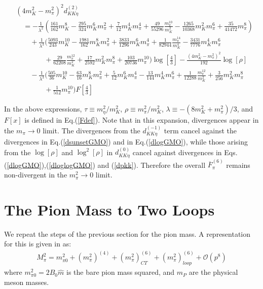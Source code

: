 \documentclass[12pt,a4paper]{article}
\begin{document}
\begin{align}
	& \left(4 m_{K}^2 - m_{\pi}^2\right)^2 {d}_{K K \eta}^{(2)} \nonumber \\
	& \quad = - \frac{1}{\lambda ^2} \left( \frac{161}{162} m_{K}^8 - \frac{295}{324} m_{K}^6 m_{\pi}^2 + \frac{7}{12} m_{K}^4 m_{\pi}^4 + \frac{49}{55296} \frac{m_{\pi}^{10}}{m_{K}^2} - \frac{1265}{10368} m_{K}^2 m_{\pi}^6 + \frac{35}{41472} m_{\pi}^8 \right) \nonumber \\
	& \qquad + \frac{1}{\lambda^3} \bigg( \frac{5093}{243} m_{K}^{10} - \frac{1981}{162} m_{K}^8 m_{\pi}^2 + \frac{3833}{1296} m_{K}^6 m_{\pi}^4 + \frac{1}{82944} \frac{m_{\pi}^{14}}{m_{K}^4} - \frac{3431}{7776} m_{K}^4 m_{\pi}^6 \nonumber \\
	& \qquad \qquad + \frac{29}{62208} \frac{m_{\pi}^{12}}{m_{K}^2} + \frac{17}{2592} m_{K}^2 m_{\pi}^8 + \frac{103}{20736} m_{\pi}^{10} \bigg) \log \left[\frac{4}{3}\right] -\frac{\left(4 m_{K}^2-m_{\pi}^2\right)^2}{192} \log [\rho] \nonumber \\
	& \qquad  -\frac{1}{\lambda^3} \bigg( \frac{505}{36} m_{K}^{10} - \frac{63}{16} m_{K}^8 m_{\pi}^2 + \frac{5}{12} m_{K}^6 m_{\pi}^4 - \frac{13}{144} m_{K}^4 m_{\pi}^6 + \frac{1}{12288} \frac{m_{\pi}^{12}}{m_{K}^2} + \frac{3}{256} m_{K}^2 m_{\pi}^8 \nonumber \\
	& \qquad \qquad + \frac{1}{512} m_{\pi}^{10} \bigg) F \left[\frac{4}{3}\right]
\end{align}


In the above expressions, $\tau \equiv m_{\eta}^2/m_{K}^2$, $\rho \equiv m_{\pi}^2/m_{K}^2$, $\lambda \equiv - \left( 8 m_K^2 + m_{\pi}^2 \right)/3 $, and $F[x]$ is defined in Eq.(\ref{Fdef}). Note that in this expansion, divergences appear in the $m_{\pi} \rightarrow 0$ limit. The divergences from the ${d}_{K K \eta}^{(-1)}$ term cancel against the divergences in Eq.(\ref{dsunsetGMO}) and in Eq.(\ref{dlogGMO}), while those arising from the $\log[\rho]$ and $\log^2[\rho]$ in ${d}_{K K \eta}^{(0)}$ cancel against divergences in Eqs.(\ref{dlogGMO}),(\ref{dloglogGMO}) and (\ref{dpkk}). Therefore the overall $\overline{F}_{\pi}^{(6)}$ remains non-divergent in the $m^2_{\pi} \rightarrow 0$ limit.



\section{The Pion Mass to Two Loops \label{SecPionMass}}

We repeat the steps of the previous section for the pion mass. A representation for this is given in \cite{Amoros:1999dp} as:
\begin{align}
	M_{\pi}^2 = m_{\pi 0}^2 + (m_{\pi}^2)^{(4)} + (m_{\pi}^2)^{(6)}_{CT} + (m_{\pi}^2)^{(6)}_{loop} + \mathcal{O}(p^8) 
\end{align}
where $m_{\pi 0}^2 = 2 B_0 \hat{m}$ is the bare pion mass squared, and $m_{P}$ are the physical meson masses.
\end{document}
